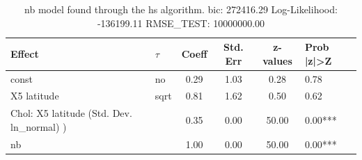 \begin{table}
	\caption{nb model found through the hs algorithm. bic: 272416.29 Log-Likelihood: -136199.11 RMSE_TEST: 10000000.00}
	\begin{center}
		\begin{tabular}{|l|l|c|c|c|l|}
			\hline
			Effect & $\tau$ & Coeff & Std. Err & z-values & Prob |z|>Z \\
			\hline
			const & no & 0.29 & 1.03 & 0.28 & 0.78 \\
			\hline
			X5 latitude & sqrt & 0.81 & 1.62 & 0.50 & 0.62 \\
			\hline
			 Chol: X5 latitude (Std. Dev. ln_normal) ) &  & 0.35 & 0.00 & 50.00 & 0.00*** \\
			\hline
			nb &  & 1.00 & 0.00 & 50.00 & 0.00*** \\
			\hline
		\end{tabular}
	\end{center}
\end{table}